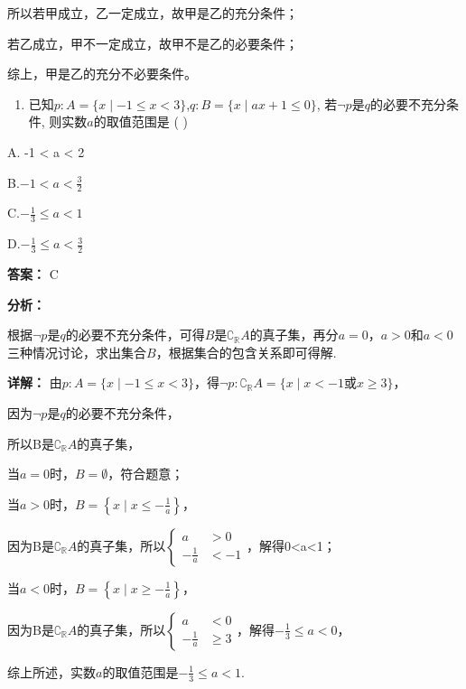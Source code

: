 \documentclass[11pt,a4paper]{ctexart}
\begin{document}
所以若甲成立，乙一定成立，故甲是乙的充分条件；

若乙成立，甲不一定成立，故甲不是乙的必要条件；

综上，甲是乙的充分不必要条件。

\begin{enumerate}[label=\arabic*., leftmargin=*, start=6]
\item 已知\(p: A = \{x \mid -1 \leq x < 3\}\),\(q: B = \{x \mid ax + 1 \leq 0\}\),
  若\(\neg p\)是\(q\)的必要不充分条件, 则实数\(a\)的取值范围是 ( )
\end{enumerate}

A. -1 \textless{} a \textless{} 2

B.\(-1 < a < \frac{3}{2}\)

C.\(-\frac{1}{3} \leq a < 1\)

D.\(-\frac{1}{3} \leq a < \frac{3}{2}\)

\textbf{答案：}
C

\textbf{分析：}

根据\(\neg p\)是\(q\)的必要不充分条件，可得\(B\)是\(\complement_{\mathbb{R}} A\)的真子集，再分\(a = 0\)，\(a > 0\)和\(a < 0\)三种情况讨论，求出集合\(B\)，根据集合的包含关系即可得解.

\textbf{详解：}
由\(p:A=\{x\mid-1\leq x<3\}\)，得\(\neg p:\complement_{\mathbb{R}}A=\{x\mid x<-1或x\geq3\}\)，

因为\(\neg p\)是\(q\)的必要不充分条件，

所以B是\(\complement_{\mathbb{R}}A\)的真子集，

当\(a = 0\)时，\(B = \emptyset\)，符合题意；

当\(a > 0\)时，\(B = \left\{x \mid x \leq -\frac{1}{a}\right\}\)，

因为B是\(\complement_{\mathbb{R}}A\)的真子集，所以\(\left\{\begin{aligned}a&>0\\ -\frac{1}{a}&<-1\end{aligned}\right.\)，解得0\textless a\textless1；

当\(a < 0\)时，\(B = \left\{x \mid x \geq -\frac{1}{a}\right\}\)，

因为B是\(\complement_{\mathbb{R}}A\)的真子集，所以\(\left\{\begin{aligned}a&<0\\ -\frac{1}{a}&\geq3\end{aligned}\right.\)，解得\(-\frac{1}{3}\leq a<0\)，

综上所述，实数\(a\)的取值范围是\(-\frac{1}{3} \leq a < 1\).
\end{document}
